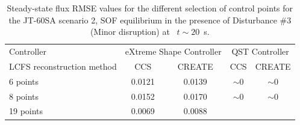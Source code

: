 \begin{table}[]
	\centering
	\begin{tabular}{|l|c|c|c|c|}
		\hline
		\rowcolor{color2}
		\multicolumn{5}{|c|}{\textbf{Disturbance $\#3$ (Minor disruption) flux RMSE steady state      ~ ~ Wb/2$\pi$}}                                                                 \\ \hline
		\rowcolor{color1}
		Controller                 & \multicolumn{2}{c|}{eXtreme Shape Controller} & \multicolumn{2}{c|}{QST Controller}                 \\ \hline
		LCFS reconstruction method & CCS                   & CREATE                & CCS                      & CREATE                   \\ \hline
		6 points                   & 0.0121                & 0.0139                & $\sim 0$               & $\sim 0$                  \\ \hline
		8 points                   & 0.0152                & 0.0170                & $\sim 0$                 & $\sim 0$                  \\ \hline
		19 points                  & 0.0069                & 0.0088                & \cellcolor[HTML]{C0C0C0} & \cellcolor[HTML]{C0C0C0} \\ \hline
	\end{tabular}
	\caption{Steady-state flux RMSE values for the different selection of control points for  the JT-60SA scenario 2, SOF equilibrium in the presence of  Disturbance $\# 3$ (Minor disruption) at ~$t\sim 20 $~s. }
	\label{fluxRMSE_mnr_table}
\end{table}






